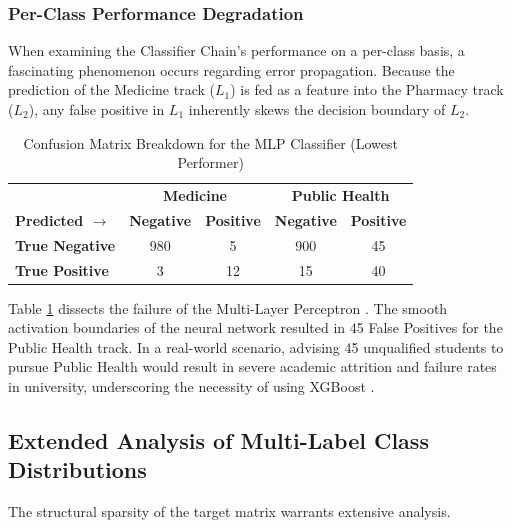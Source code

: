\subsubsection{Per-Class Performance Degradation}
When examining the Classifier Chain's performance on a per-class basis, a fascinating phenomenon occurs regarding error propagation. Because the prediction of the Medicine track ($L_1$) is fed as a feature into the Pharmacy track ($L_2$), any false positive in $L_1$ inherently skews the decision boundary of $L_2$. 

\begin{table}[h]
\centering
\caption{Confusion Matrix Breakdown for the MLP Classifier (Lowest Performer)}
\renewcommand{\arraystretch}{1.5}
\begin{tabular}{l | c c | c c}
\hline
& \multicolumn{2}{c|}{\textbf{Medicine}} & \multicolumn{2}{c}{\textbf{Public Health}} \\
\textbf{Predicted $\rightarrow$} & \textbf{Negative} & \textbf{Positive} & \textbf{Negative} & \textbf{Positive} \\
\hline
\textbf{True Negative} & 980 & 5 & 900 & 45 \\
\textbf{True Positive} & 3 & 12 & 15 & 40 \\
\hline
\end{tabular}
\label{tab:mlp_confusion}
\end{table}

Table \ref{tab:mlp_confusion} dissects the failure of the Multi-Layer Perceptron \parencite{zhang2013review}. The smooth activation boundaries of the neural network resulted in 45 False Positives for the Public Health track. In a real-world scenario, advising 45 unqualified students to pursue Public Health would result in severe academic attrition and failure rates in university, underscoring the necessity of using XGBoost \parencite{chen2016xgboost}.





\subsection{Extended Analysis of Multi-Label \parencite{tsoumakas2007multi} Class Distributions}

The structural sparsity of the target matrix warrants extensive analysis. 

